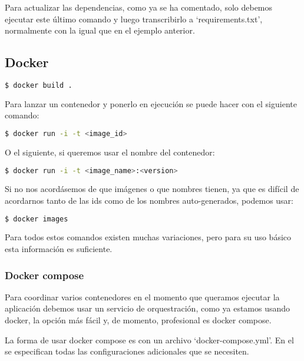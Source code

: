 Para actualizar las dependencias, como ya se ha comentado, solo debemos ejecutar este último comando y luego transcribirlo a `requirements.txt', normalmente con la  igual que en el ejemplo anterior.

\subsection{Docker}

\lstset{style=linestyle}
\begin{lstlisting}[language=bash]
    $ docker build .
\end{lstlisting}

Para lanzar un contenedor y ponerlo en ejecución se puede hacer con el siguiente comando:

\lstset{style=linestyle}
\begin{lstlisting}[language=bash]
    $ docker run -i -t <image_id>
\end{lstlisting}

O el siguiente, si queremos usar el nombre del contenedor:

\lstset{style=linestyle}
\begin{lstlisting}[language=bash]
    $ docker run -i -t <image_name>:<version>
\end{lstlisting}

Si no nos acordásemos de que imágenes o que nombres tienen, ya que es difícil de acordarnos tanto de las ids como de los nombres auto-generados, podemos usar:

\lstset{style=linestyle}
\begin{lstlisting}[language=bash]
    $ docker images
\end{lstlisting}

Para todos estos comandos existen muchas variaciones, pero para su uso básico esta información es suficiente.

\subsubsection{Docker compose}

Para coordinar varios contenedores en el momento que queramos ejecutar la aplicación debemos usar un servicio de orquestración, como ya estamos usando docker, la opción más fácil y, de momento, profesional es docker compose.

La forma de usar docker compose es con un archivo `docker-compose.yml'. En el se especifican todas las configuraciones adicionales que se necesiten. 


